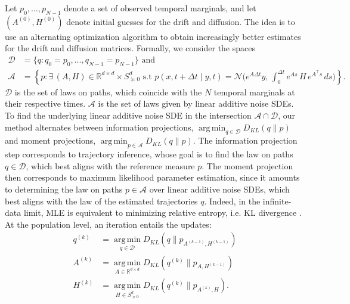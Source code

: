 \documentclass[twoside,11pt]{article}
\newcommand{\R} {\mathbb R}
\DeclareMathOperator*{\argmin}{arg\,min}
\begin{document}
Let $p_0, ..., p_{N-1}$ denote a set of observed temporal marginals, and let $(A^{(0)}, H^{(0)})$ denote initial guesses for the drift and diffusion. The idea is to use an alternating optimization algorithm to obtain increasingly better estimates for the drift and diffusion matrices. Formally, we consider the spaces
\begin{align}
    \mathcal{D} &=\{q: q_0 = p_0, ..., q_{N-1} = p_{N-1} \}
    \label{eq: marginal_constraints} \text{ and }\\
    \mathcal{A} &= \left\{ p : \exists\, (A, H) \in \mathbb{R}^{d \times d} \times S^d_{\succeq 0} \text{ s.t } p(x, t+\Delta t \mid y, t) = \mathcal{N}\Big(e^{A\Delta t}y,\, \int_0^{\Delta t} e^{A s}\,H\,e^{A^\top  s}\, ds\Big) \right\}.
    \label{eq: projection_spaces_for_method}
\end{align}
$\mathcal{D}$ is the set of laws on paths, which coincide with the $N$ temporal marginals at their respective times. $\mathcal{A}$ is the set of laws given by linear additive noise SDEs. To find the underlying linear additive noise SDE in the intersection $\mathcal{A} \cap \mathcal{D}$, our method alternates between information projections, $\argmin_{q \in \mathcal{D}}D_{KL}(q \| p)$ and moment projections, $\argmin_{p \in \mathcal{A}}D_{KL}(q \| p)$. The information projection step corresponds to trajectory inference, whose goal is to find the law on paths $q \in \mathcal{D}$, which best aligns with the reference measure $p$. The moment projection then corresponds to maximum likelihood parameter estimation, since it amounts to determining the law on paths $p \in \mathcal{A}$ over linear additive noise SDEs, which best aligns with the law of the estimated trajectories $q$. Indeed, in the infinite-data limit, MLE is equivalent to minimizing relative entropy, i.e. KL divergence \citep{akaike1998information, white1982maximum}. At the population level, an iteration entails the updates:
\begin{align}
q^{(k)} &= \argmin\limits_{q \in \mathcal{D}}D_{KL}(q \| p_{A^{(k-1)}, H^{(k-1)}})\label{eq: entropy_min_to_reference_sde}\\
A^{(k)} &= \argmin\limits_{A \in \R^{d \times d}}D_{KL}(q^{(k)} \| p_{A, H^{(k-1)}})\label{eq: entropy_min_drift}\\
H^{(k)} &= \argmin\limits_{H \in S^d_{\succeq 0}}D_{KL}(q^{(k)} \| p_{A^{(k)}, H}).
\label{eq: entropy_min_diffusion}
\end{align} 
\end{document}
